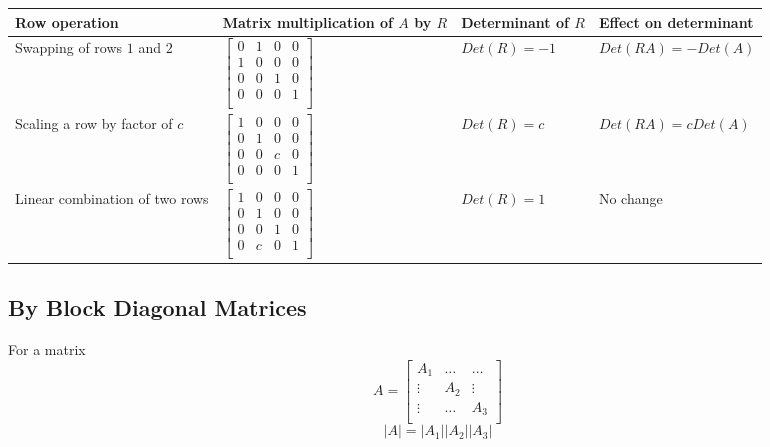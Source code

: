 \begin{center}
   \begin{tabular}{|p{3cm}| p{3cm}| p{3cm}| p{5cm}|}
   \hline
   Row operation & Matrix multiplication of $A$ by $R$ & Determinant of $R$ & Effect on determinant \\
   \hline
   Swapping of rows $1$ and $2$ &  
   $ \begin{bmatrix} 
      0 & 1 & 0 & 0\\
      1 & 0 & 0 & 0\\
      0 & 0 & 1 & 0\\
      0 & 0 & 0 & 1\\
   \end{bmatrix}$ 
    & $Det(R) =-1$ & $Det(RA) = -Det(A)$ \\ 
   \hline
   Scaling a row by factor of $c$ & 
   $ \begin{bmatrix} 
      1 & 0 & 0 & 0\\
      0 & 1 & 0 & 0\\
      0 & 0 & c & 0\\
      0 & 0 & 0 & 1\\
   \end{bmatrix}$  & 
   $ Det(R) = c$ & 
    $Det (RA) = cDet(A)$ \\
   \hline
   Linear combination of two rows & 
   $ \begin{bmatrix} 
      1 & 0 & 0 & 0\\
      0 & 1 & 0 & 0\\
      0 & 0 & 1 & 0\\
      0 & c & 0 & 1\\
   \end{bmatrix}$  & 
   $ Det(R)=1$ & 
   No change
    \\
    \hline
  \end{tabular}
\end{center}

\subsection{By Block Diagonal Matrices}
\begin{framed}
   For a matrix  \[
     A = \begin{bmatrix} 
        A_1 & \hdots & \hdots \\
        \vdots & A_2 & \vdots \\
        \vdots & \hdots & A_3 \\
     \end{bmatrix}
   \] 
   \[
     \left| A \right| = \left| A_1 \right| \left| A_2 \right| \left| A_3 \right| 
   \] 

  
\end{framed}




